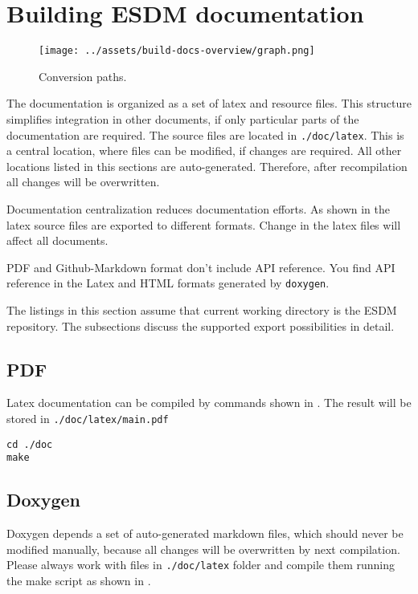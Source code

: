 \section{Building ESDM documentation}

\begin{figure}[!ht]
  \centering
  \texttt{[image: ../assets/build-docs-overview/graph.png]}
  \caption{Conversion paths.}
  \label{fig:build-docs-overview}
\end{figure}

The documentation is organized as a set of latex and resource files.
This structure simplifies integration in other documents, if only particular parts of the documentation are required.
The source files are located in \lstinline|./doc/latex|.
This is a central location, where files can be modified, if changes are required.
All other locations listed in this sections are auto-generated.
Therefore, after recompilation all changes will be overwritten.

Documentation centralization reduces documentation efforts.
As shown in  the latex source files are exported to different formats.
Change in the latex files will affect all documents.

PDF and Github-Markdown format don't include API reference.
You find API reference in the Latex and HTML formats generated by \lstinline|doxygen|.

The listings in this section assume that current working directory is the ESDM repository.
The subsections discuss the supported export possibilities in detail.

\subsection{PDF}
Latex documentation can be compiled by commands shown in .
The result will be stored in \lstinline|./doc/latex/main.pdf|

\begin{lstlisting}[caption={Make PDF document},label={lst:doc:latex}]
cd ./doc
make
\end{lstlisting}

\subsection{Doxygen}
Doxygen depends a set of auto-generated markdown files, which should never be modified manually, because all changes will be overwritten by next compilation.
Please always work with files in \lstinline|./doc/latex| folder and compile them running the make script as shown in .

